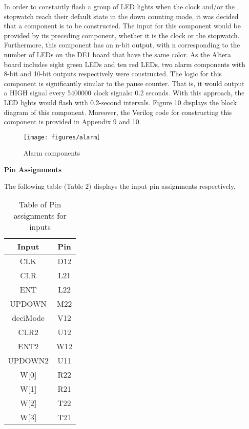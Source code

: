 \documentclass[12pt,a4paper]{article}
\begin{document}
	\noindent In order to constantly flash a group of LED lights when the clock and/or the stopwatch reach their default state in the down counting mode, it was decided that a component is to be constructed. The input for this component would be provided by its preceding component, whether it is the clock or the stopwatch. Furthermore, this component has an n-bit output, with n corresponding to the number of LEDs on the DE1 board that have the same color. As the Altera board includes eight green LEDs and ten red LEDs, two alarm components with 8-bit and 10-bit outputs respectively were constructed. The logic for this component is significantly similar to the pause counter. That is, it would output a HIGH signal every 5400000 clock signals: 0.2 seconds. With this approach, the LED lights would flash with 0.2-second intervals. Figure 10 displays the block diagram of this component. Moreover, the Verilog code for constructing this component is provided in Appendix 9 and 10.
	
	\vspace{-0.2cm}
	\begin{figure}[H]
		\centering
		\texttt{[image: figures/alarm]}
		\caption{Alarm components}
	\end{figure}
	
	\vfill
	\vspace{20cm}
	
	\noindent \textbf{\large Pin Assignments}
	\vspace{0.2cm}
	
	\noindent The following table (Table 2) displays the input pin assignments respectively.
\begin{table}[H]
	\centering
	\begin{tabular}{|c | c| }
		\hline
		\textbf{Input} & \textbf{Pin} \\ \hline
		CLK& D12\\\hline
		CLR& L21\\\hline
		ENT& L22\\\hline
		UPDOWN & M22\\\hline
		deciMode & V12\\\hline
		CLR2&U12\\\hline
		ENT2&W12\\\hline
		UPDOWN2&U11\\\hline
		W[0] & R22\\\hline
		W[1] &R21\\\hline
		W[2] &T22\\\hline
		W[3] &T21\\\hline
	\end{tabular}
	\caption{Table of Pin assignments for inputs}
\end{table}
\end{document}
